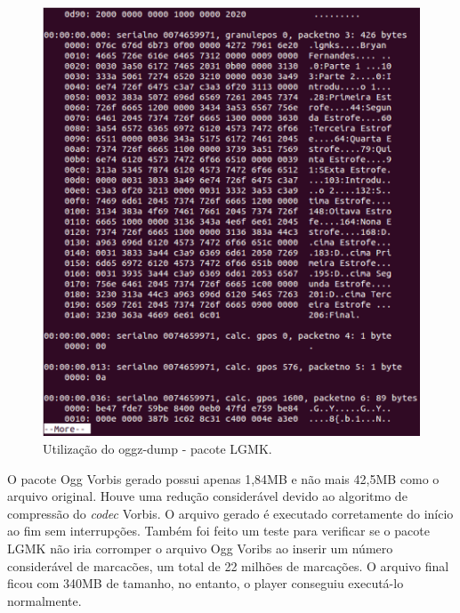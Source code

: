  \begin{figure}[ht]
	\centering
		\includegraphics[keepaspectratio=true,scale=0.4]{figuras/hnblgmkogg.eps}
	\caption{Utilização do oggz-dump - pacote LGMK.}
	\label{lgmk}
\end{figure}

O pacote Ogg Vorbis gerado possui apenas 1,84MB e não mais 42,5MB como o arquivo original. Houve uma redução considerável devido ao algoritmo de compressão do \textit{codec} Vorbis. O arquivo gerado é executado corretamente do início ao fim sem interrupções. Também foi feito um teste para verificar se o pacote LGMK não iria corromper o arquivo Ogg Voribs ao inserir um número considerável de marcacões, um total de 22 milhões de marcações. O arquivo final ficou com 340MB de tamanho, no entanto, o player conseguiu executá-lo normalmente.




